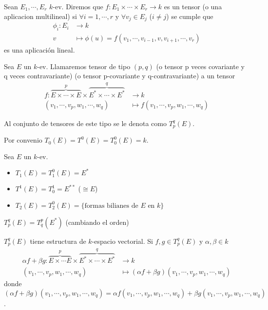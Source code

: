 \begin{defi}
	Sean $E_1,\cdots , E_r$ $k$-ev. Diremos que
	$f \colon E_1 \times \cdots \times E_r \to k$ es un tensor (o una aplicacion
	multilineal) si $\forall i=1,\cdots , r$ y $\forall v_j \in E_j$ ($i \neq j$)
	se cumple que
	\[
		 \begin{aligned}
			 \phi_i \colon E_i &\to k \\
			 v &\mapsto \phi(u)=f(v_1,\cdots , v_{i-1}, v, v_{i+1}, \cdots , v_r)
		 \end{aligned}
	\]
	es una aplicación lineal.
\end{defi}
\begin{defi}
	Sea $E$ un $k$-ev. Llamaremos tensor de tipo $(p,q)$ (o tensor p veces
	covariante y q veces contravariante) (o tensor p-covariante y q-contravariante)
	a un tensor
	\[
		\begin{aligned}
			f \colon \overbrace{E \times \cdots \times E}^p\times
			\overbrace{E^* \times \cdots \times E^*}^q&\to k \\
			(v_1, \cdots, v_p, w_1, \cdots, w_q) &\mapsto
			f(v_1,\cdots,v_p,w_1,\cdots,w_q)
		\end{aligned}
	\]
\end{defi}
\begin{obs}
	Al conjunto de tensores  de este tipo se le denota como $T_p^q(E)$.
\end{obs}
\begin{obs}
	Por convenio $T_0(E) = T^0(E) = T_0^0(E) = k$.
\end{obs}
\begin{example}
	Sea $E$ un $k$-ev.
	\begin{itemize}
		\item $T_1(E) = T_1^0(E) = E^*$
		\item $T^1(E) = T_0^1 = E^{**}$ ($\cong E$)
		\item $T_2(E) = T_2^0(E) = \{\text{formas bilianes de } E \text{ en } k\}$
	\end{itemize}
\end{example}
\begin{prop}
	$T_p^q(E) = T_q^p(E^*)$ (cambiando el orden)
\end{prop}
\begin{prop}
	$T_p^q(E)$ tiene estructura de $k$-espacio vectorial. Si $f, g \in T_p^q(E)$ y
	$\alpha , \beta \in k$
	\[
		\begin{aligned}
			\alpha f + \beta g \colon \overbrace{E \times \cdots E}^p \times
			\overbrace{E^* \times \cdots \times E^*}^q &\to k \\
			(v_1, \cdots, v_p, w_1, \cdots, w_q) &\mapsto (\alpha f + \beta g)
			(v_1, \cdots, v_p, w_1, \cdots, w_q)
		\end{aligned}
	\]
	donde $(\alpha f + \beta g) (v_1, \cdots, v_p, w_1, \cdots, w_q) =
	\alpha f(v_1, \cdots, v_p, w_1, \cdots, w_q) + \beta
	g(v_1, \cdots, v_p, w_1, \cdots, w_q)$.
\end{prop}
